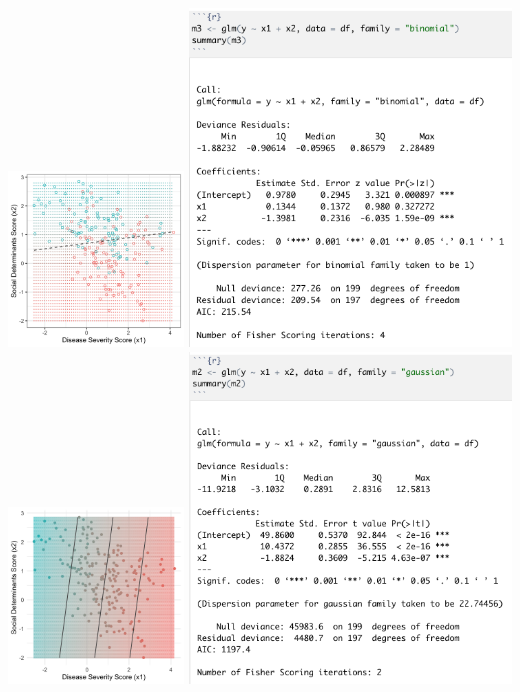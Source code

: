 \begin{center}
\includegraphics[width=0.35\textwidth]{img/esl-logistic-prob-axes.png}
\includegraphics[width=0.64\textwidth]{img/glm-binomial-example.png}\\[8mm]
\includegraphics[width=0.35\textwidth]{img/esl-reg-linear-wlabels.png}
\includegraphics[width=0.64\textwidth]{img/glm-gaussian-example.png}
\end{center}

